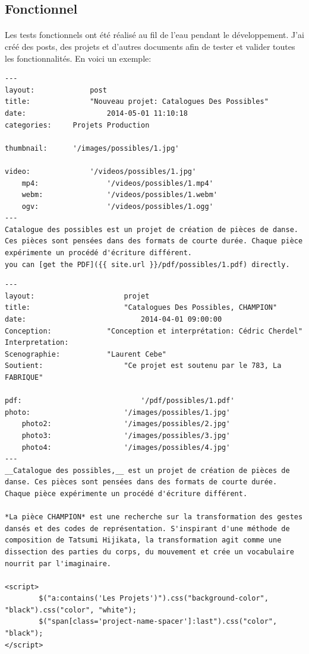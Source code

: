 \documentclass[11pt,a4paper]{report}
\begin{document}
		\subsection{Fonctionnel}
			\paragraph*{}Les tests fonctionnels ont été réalisé au fil de l'eau pendant le développement. J'ai créé des posts, des projets et d'autres documents afin de tester et valider toutes les fonctionnalités. En voici un exemple:
			
			\lstset{caption=fichier Markdown d'un post}
			\begin{lstlisting}
---
layout:				post
title:				"Nouveau projet: Catalogues Des Possibles"
date:					2014-05-01 11:10:18
categories:		Projets Production

thumbnail:		'/images/possibles/1.jpg'

video:				'/videos/possibles/1.jpg'
	mp4:				'/videos/possibles/1.mp4'
	webm:				'/videos/possibles/1.webm'
	ogv:				'/videos/possibles/1.ogg'
---
Catalogue des possibles est un projet de création de pièces de danse. Ces pièces sont pensées dans des formats de courte durée. Chaque pièce expérimente un procédé d'écriture différent.
you can [get the PDF]({{ site.url }}/pdf/possibles/1.pdf) directly.
			\end{lstlisting}

			\lstset{caption=fichier Markdown d'un projet}
			\begin{lstlisting}
---
layout:						projet
title:						"Catalogues Des Possibles, CHAMPION"
date:							2014-04-01 09:00:00
Conception:				"Conception et interprétation: Cédric Cherdel"
Interpretation:     
Scenographie:			"Laurent Cebe"
Soutient:					"Ce projet est soutenu par le 783, La FABRIQUE"

pdf:							'/pdf/possibles/1.pdf'
photo:						'/images/possibles/1.jpg'
	photo2:					'/images/possibles/2.jpg'
	photo3:					'/images/possibles/3.jpg'
	photo4:					'/images/possibles/4.jpg'
---
__Catalogue des possibles,__ est un projet de création de pièces de danse. Ces pièces sont pensées dans des formats de courte durée. Chaque pièce expérimente un procédé d'écriture différent.

*La pièce CHAMPION* est une recherche sur la transformation des gestes dansés et des codes de représentation. S'inspirant d'une méthode de composition de Tatsumi Hijikata, la transformation agit comme une dissection des parties du corps, du mouvement et crée un vocabulaire nourrit par l'imaginaire.

<script>
		$("a:contains('Les Projets')").css("background-color", "black").css("color", "white");
		$("span[class='project-name-spacer']:last").css("color", "black");
</script>
			 \end{lstlisting}			 
\end{document}
